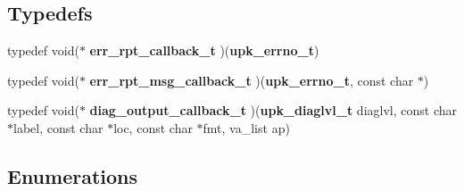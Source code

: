 \subsection*{Typedefs}
\begin{DoxyCompactItemize}
\item 
typedef void($\ast$ {\bf err\_\-rpt\_\-callback\_\-t} )({\bf upk\_\-errno\_\-t})
\item 
typedef void($\ast$ {\bf err\_\-rpt\_\-msg\_\-callback\_\-t} )({\bf upk\_\-errno\_\-t}, const char $\ast$)
\item 
typedef void($\ast$ {\bf diag\_\-output\_\-callback\_\-t} )({\bf upk\_\-diaglvl\_\-t} diaglvl, const char $\ast$label, const char $\ast$loc, const char $\ast$fmt, va\_\-list ap)
\end{DoxyCompactItemize}
\subsection*{Enumerations}
